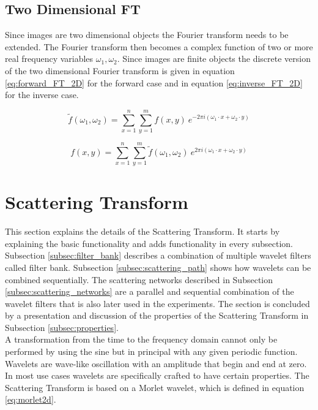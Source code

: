 \subsection{Two Dimensional FT}

Since images are two dimensional objects the Fourier transform needs to be extended. The Fourier transform then becomes a complex function of two or more real frequency variables $\omega_1, \omega_2$. Since images are finite objects the discrete version of the two dimensional Fourier transform is given in equation \ref{eq:forward_FT_2D} for the forward case and in equation \ref{eq:inverse_FT_2D} for the inverse case.

\begin{equation}
	\tilde{f}(\omega_1, \omega_2) = \sum_{x=1}^{n} \sum_{y=1}^{m} f(x,y)\ e^{-2\pi i (\omega_1 \cdot x + \omega_2 \cdot y)}
\label{eq:forward_FT_2D}
\end{equation}

\begin{equation}
f(x, y) = \sum_{x=1}^{n} \sum_{y=1}^{m} \tilde{f}(\omega_1, \omega_2)\ e^{2\pi i (\omega_1 \cdot x + \omega_2 \cdot y)}
\label{eq:inverse_FT_2D}
\end{equation}


\section{Scattering Transform}
\label{sec:scattering_transform}

This section explains the details of the Scattering Transform. It starts by explaining the basic functionality and adds functionality in every subsection. Subsection \ref{subsec:filter_bank} describes a combination of multiple wavelet filters called filter bank. Subsection \ref{subsec:scattering_path} shows how wavelets can be combined sequentially. The scattering networks described in Subsection \ref{subsec:scattering_networks} are a parallel and sequential combination of the wavelet filters that is also later used in the experiments. The section is concluded by a presentation and discussion of the properties of the Scattering Transform in Subsection \ref{subsec:properties}. \\
A transformation from the time to the frequency domain cannot only be performed by using the sine but in principal with any given periodic function.
Wavelets are wave-like oscillation with an amplitude that begin and end at zero. In most use cases wavelets are specifically crafted to have certain properties. 
The Scattering Transform is based on a Morlet wavelet, which is defined in equation \ref{eq:morlet2d}.

